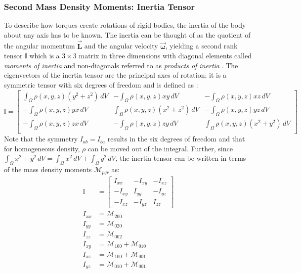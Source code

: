 \documentclass[oneside, a4paper]{book}
\newcommand\vek[1]{\vec{\bm{#1}}}
\newcommand\br[1]{\left(#1\right)}
\begin{document}
  \subsubsection{Second Mass Density Moments: Inertia Tensor}\label{subsubsec:inertia-tensor-computation}
  To describe how torques create rotations of rigid bodies, the inertia of the body about any axis has to be known. The inertia can be thought of as the quotient of the angular momentum $\vek{L}$ and the angular velocity $\vek{\omega}$, yielding a second rank tensor $\mathds{I}$ which is a $3\times 3$ matrix in three dimensions with diagonal elements called \textit{moments of inertia} and non-diagonals referred to as \textit{products of inertia} \autocite{classical-mechanics}. The eigenvectors of the inertia tensor are the principal axes of rotation; it is a symmetric tensor with six degrees of freedom and is defined as \autocites{fast-accurate-polyhedral-mass-properties}{classical-mechanics}:
  \begin{equation}\label{eq:inertia-tensor-long-definition}
    \mathds{I} = \begin{bmatrix}
      \int_\Omega \rho\br{x,y,z} \br{y^2+z^2} \,dV&
      -\int_\Omega  \rho\br{x,y,z} xy \,dV&
      -\int_\Omega  \rho\br{x,y,z} xz \,dV\\
      -\int_\Omega  \rho\br{x,y,z} yx \,dV&
      \int_\Omega  \rho\br{x,y,z} \br{x^2+z^2} \,dV&
      -\int_\Omega  \rho\br{x,y,z} yz \,dV\\
      -\int_\Omega  \rho\br{x,y,z} zx \,dV&
      -\int_\Omega  \rho\br{x,y,z} zy \,dV&
      \int_\Omega   \rho\br{x,y,z} \br{x^2+y^2} \,dV\\
    \end{bmatrix}
  \end{equation}
  Note that the symmetry $I_{ab} = I_{ba}$ results in the six degrees of freedom and that for homogeneous density, $\rho$ can be moved out of the integral. Further, since $\int_\Omega x^2+y^2\,dV = \int_\Omega x^2\,dV + \int_\Omega y^2\,dV$, the inertia tensor can be written in terms of the mass density moments $\mathcal{M}_{pqr}$ as:
  \begin{align}
    \mathds{I} &= \begin{bmatrix}
      I_{xx}&-I_{xy}&-I_{xz}\\
      -I_{xy}&I_{yy}&-I_{yz}\\
      -I_{xz}&-I_{yz}&I_{zz}
    \end{bmatrix}\\
    I_{xx} &= \mathcal{M}_{200}\\
    I_{yy} &= \mathcal{M}_{020}\\
    I_{zz} &= \mathcal{M}_{002}\\
    I_{xy} &= \mathcal{M}_{100} + \mathcal{M}_{010}\\
    I_{xz} &= \mathcal{M}_{100} + \mathcal{M}_{001}\\
    I_{yz} &= \mathcal{M}_{010} + \mathcal{M}_{001}
  \end{align}
\end{document}
